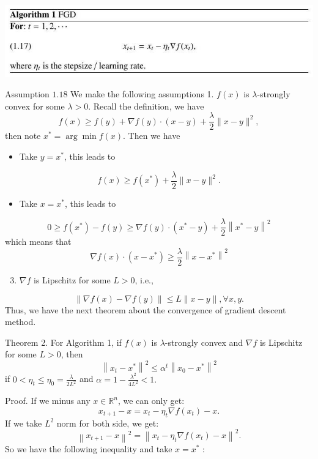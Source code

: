 \documentclass[10pt]{article}
\begin{document}
\includegraphics[max width=\textwidth]{2022_03_25_9faca01b68c57c6da639g-6}

Assumption $1.18$ We make the following assumptions 1. $f(x)$ is $\lambda$-strongly convex for some $\lambda>0$. Recall the definition, we have
$$
f(x) \geq f(y)+\nabla f(y) \cdot(x-y)+\frac{\lambda}{2}\|x-y\|^{2},
$$
then note $x^{*}=\arg \min f(x)$. Then we have

\begin{itemize}
  \item Take $y=x^{*}$, this leads to
\end{itemize}
$$
f(x) \geq f\left(x^{*}\right)+\frac{\lambda}{2}\|x-y\|^{2} .
$$

\begin{itemize}
  \item Take $x=x^{*}$, this leads to
\end{itemize}
$$
0 \geq f\left(x^{*}\right)-f(y) \geq \nabla f(y) \cdot\left(x^{*}-y\right)+\frac{\lambda}{2}\left\|x^{*}-y\right\|^{2}
$$
which means that
$$
\nabla f(x) \cdot\left(x-x^{*}\right) \geq \frac{\lambda}{2}\left\|x-x^{*}\right\|^{2}
$$

\begin{enumerate}
  \setcounter{enumi}{2}
  \item $\nabla f$ is Lipschitz for some $L>0$, i.e.,
\end{enumerate}
$$
\|\nabla f(x)-\nabla f(y)\| \leq L\|x-y\|, \forall x, y .
$$
Thus, we have the next theorem about the convergence of gradient descent method.

Theorem 2. For Algorithm 1, if $f(x)$ is $\lambda$-strongly convex and $\nabla f$ is Lipschitz for some $L>0$, then
$$
\left\|x_{t}-x^{*}\right\|^{2} \leq \alpha^{t}\left\|x_{0}-x^{*}\right\|^{2}
$$
if $0<\eta_{t} \leq \eta_{0}=\frac{\lambda}{2 L^{2}}$ and $\alpha=1-\frac{\lambda^{2}}{4 L^{2}}<1 .$

Proof. If we minus any $x \in \mathbb{R}^{n}$, we can only get:
$$
x_{t+1}-x=x_{t}-\eta_{t} \nabla f\left(x_{t}\right)-x .
$$
If we take $L^{2}$ norm for both side, we get:
$$
\left\|x_{t+1}-x\right\|^{2}=\left\|x_{t}-\eta_{t} \nabla f\left(x_{t}\right)-x\right\|^{2} .
$$
So we have the following inequality and take $x=x^{*}$ :
\end{document}
